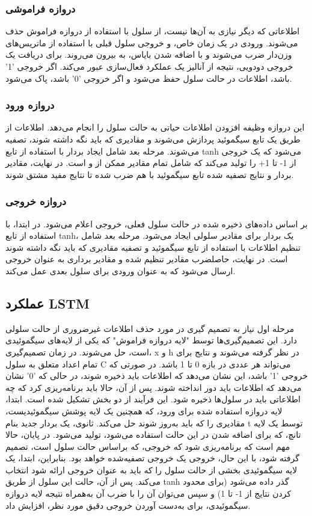 \documentclass{CSICC2020}
\begin{document}
\subsubsection{دروازه فراموشی}
اطلاعاتی که دیگر نیازی به آن‌ها نیست، از سلول با استفاده از دروازه فراموش حذف می‌شوند. ورودی در یک زمان خاص،  و خروجی سلول قبلی  با استفاده از ماتریس‌های وزن‌دار ضرب می‌شوند و با اضافه شدن بایاس، به بیرون می‌روند. برای دریافت یک خروجی دودویی، نتیجه از آنالیز یک عملکرد فعال‌سازی عبور می‌کند. اگر خروجی '1' باشد، اطلاعات در حالت سلول حفظ می‌شود و اگر خروجی '0' باشد، پاک می‌شود. 
\subsubsection{دروازه ورود}
این دروازه وظیفه افزودن اطلاعات حیاتی به حالت سلول را انجام می‌دهد. اطلاعات از طریق یک تابع سیگموئید پردازش می‌شوند و مقادیری که باید نگه داشته شوند، تصفیه می‌شوند. مرحله بعد شامل ایجاد بردار با استفاده از تابع tanh می‌شود که یک خروجی از 1- تا 1+ را تولید می‌کند که شامل تمام مقادیر ممکن از و است. در نهایت، مقادیر بردار و نتایج تصفیه شده تابع سیگموئید با هم ضرب شده تا نتایج مفید مشتق شوند. 
\subsubsection{دروازه خروجی }
بر اساس داده‌های ذخیره شده در حالت سلول فعلی، خروجی اعلام می‌شود. در ابتدا، با استفاده از تابع tanh، یک بردار برای مقادیر سلولی ایجاد می‌شود. مرحله بعد شامل تنظیم اطلاعات با استفاده از تابع سیگموئید و تصفیه مقادیری که باید نگه داشته شوند است. در نهایت، حاصلضرب مقادیر تنظیم شده و مقادیر برداری به عنوان خروجی ارسال می‌شود که به عنوان ورودی برای سلول بعدی عمل می‌کند. 
\subsection{عملکرد LSTM}
مرحله اول نیاز به تصمیم گیری در مورد حذف اطلاعات غیرضروری از حالت سلولی دارد. این تصمیم‌گیری‌ها توسط "لایه دروازه فراموش" که یکی از لایه‌های سیگموئیدی است، حل می‌شوند. در زمان تصمیم‌گیری، x  و h در نظر گرفته می‌شوند و نتایج برای تمام اعداد متعلق به سلول C می‌تواند هر عددی در بازه 0 تا 1 باشد. در صورتی که خروجی '1' باشد، این نشان می‌دهد که اطلاعات باید ذخیره شوند، در حالی که '0' نشان می‌دهد که اطلاعات باید دور انداخته شوند. 
پس از آن، حالا باید برنامه‌ریزی کرد که چه اطلاعاتی باید در سلول‌ها ذخیره شود. این فرآیند از دو بخش تشکیل شده است. ابتدا، لایه دروازه استفاده شده برای ورود، که همچنین یک لایه پوشش سیگموئیدیست، مقادیری را که باید به‌روز شوند حل می‌کند. ثانوی، یک بردار جدید بنام t توسط یک لایه تانچ، که برای اضافه شدن در این حالت استفاده می‌شود، تولید می‌شود. 
در پایان، حالا مهم است که برنامه‌ریزی شود که خروجی، که براساس حالت سلول است، تصمیم گرفته شود، با این حال، خروجی یک خروجی تصفیه‌شده خواهد بود. بنابراین، ابتدا، یک لایه سیگموئیدی بخشی از حالت سلول را که باید به عنوان خروجی ارائه شود انتخاب می‌کند. پس از آن، حالت این سلول از طریق tanh گذر داده می‌شود (برای محدود کردن نتایج از 1- تا 1) و سپس می‌توان آن را با ضرب آن به‌همراه نتیجه لایه دروازه سیگموئیدی، برای به‌دست آوردن خروجی دقیق مورد نظر، افزایش داد. 
\end{document}
